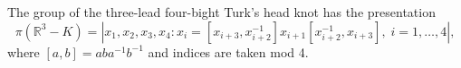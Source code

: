 The group of the three-lead four-bight Turk's head knot has the presentation
$$\pi(\mathbb{R}^3 - K) = |x_1, x_2, x_3, x_4 : x_i = [x_{i+3}, x_{i+2}^{-1}]x_{i+1}[x_{i+2}^{-1}, x_{i+3}], \; i = 1, \ldots, 4|,$$
where $[a,b] = aba^{-1}b^{-1}$ and indices are taken mod 4.
